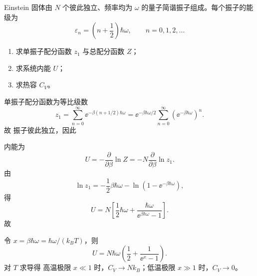 \begin{question}
Einstein 固体由 $N$ 个彼此独立、频率均为 $\omega$ 的量子简谐振子组成。每个振子的能级为
\[
\varepsilon_n=\left(n+\frac12\right)\hbar\omega,\qquad n=0,1,2,\dots
\]

\begin{enumerate}[label=(\arabic*),leftmargin=2.5em]
  \item 求单振子配分函数 $z_1$ 与总配分函数 $Z$；
  \item 求系统内能 $U$；
  \item 求热容 $C_V$。
\end{enumerate}

\begin{solution}
单振子配分函数为等比级数
\[
z_1=\sum_{n=0}^{\infty}\ee^{-\beta(n+1/2)\hbar\omega}
=\ee^{-\beta\hbar\omega/2}\sum_{n=0}^{\infty}(\ee^{-\beta\hbar\omega})^n.
\]
故
振子彼此独立，因此

内能为
\[
U=-\frac{\partial}{\partial\beta}\ln Z
=-N\frac{\partial}{\partial\beta}\ln z_1.
\]
由
\[
\ln z_1=-\frac12\beta\hbar\omega-\ln(1-\ee^{-\beta\hbar\omega}),
\]
得
\[
U=N\left[\frac12\hbar\omega+\frac{\hbar\omega}{\ee^{\beta\hbar\omega}-1}\right].
\]
故

令 $x=\beta\hbar\omega=\hbar\omega/(k_B T)$，则
\[
U=N\hbar\omega\left(\frac12+\frac{1}{\ee^x-1}\right).
\]
对 $T$ 求导得
高温极限 $x\ll 1$ 时，$C_V\to Nk_B$；低温极限 $x\gg 1$ 时，$C_V\to 0$。
\end{solution}
\end{question}
